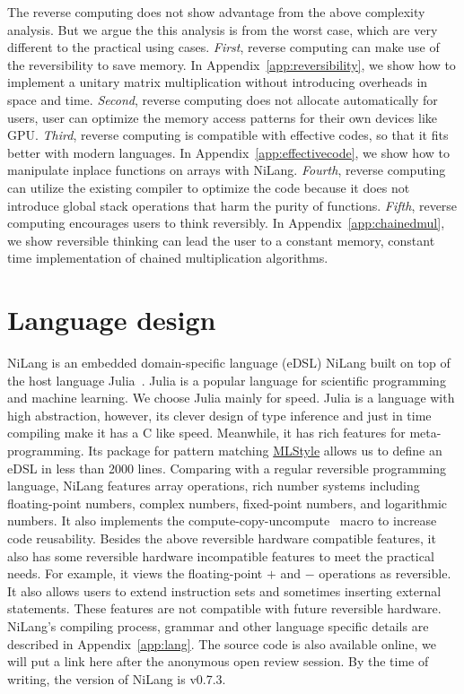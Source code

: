 \documentclass{article}
\newcommand{\<}{\langle}
\renewcommand{\>}{\rangle}
\renewcommand{\cite}[1]{{\citep{#1}}}
\newcommand{\App}[1]{Appendix~\ref{#1}}
\theoremstyle{definition}\newtheorem{definition}{\textit{Definition}}
\begin{document}
The reverse computing does not show advantage from the above complexity analysis.
But we argue the this analysis is from the worst case, which are very different to the practical using cases.
\textit{First}, reverse computing can make use of the reversibility to save memory. In \App{app:reversibility}, we show how to implement a unitary matrix multiplication without introducing overheads in space and time.
\textit{Second}, reverse computing does not allocate automatically for users, user can optimize the memory access patterns for their own devices like GPU.
\textit{Third}, reverse computing is compatible with effective codes, so that it fits better with modern languages. In \App{app:effectivecode}, we show how to manipulate inplace functions on arrays with NiLang.
\textit{Fourth}, reverse computing can utilize the existing compiler to optimize the code because it does not introduce global stack operations that harm the purity of functions.
\textit{Fifth}, reverse computing encourages users to think reversibly. In \App{app:chainedmul}, we show reversible thinking can lead the user to a constant memory, constant time implementation of chained multiplication algorithms.

\section{Language design}\label{sec:lang}

NiLang is an embedded domain-specific language (eDSL) NiLang built on top of the host language Julia~\cite{Bezanson2012,Bezanson2017}.
Julia is a popular language for scientific programming and machine learning. We choose Julia mainly for speed. Julia is a language with high abstraction, however, its clever design of type inference and just in time compiling make it has a C like speed.
Meanwhile, it has rich features for meta-programming. Its package for pattern matching \href{https://github.com/thautwarm/MLStyle.jl}{MLStyle} allows us to define an eDSL in less than 2000 lines.
Comparing with a regular reversible programming language, NiLang features array operations, rich number systems including floating-point numbers, complex numbers, fixed-point numbers, and logarithmic numbers.
It also implements the compute-copy-uncompute~\cite{Bennett1973} macro to increase code reusability.
Besides the above reversible hardware compatible features, it also has some reversible hardware incompatible features to meet the practical needs. For example, it views the floating-point $\mathrel{+}$ and $\mathrel{-}$ operations as reversible. It also allows users to extend instruction sets and sometimes inserting external statements. These features are not compatible with future reversible hardware.
NiLang's compiling process, grammar and other language specific details are described in \App{app:lang}.
The source code is also available online, we will put a link here after the anonymous open review session.
By the time of writing, the version of NiLang is v0.7.3.
\end{document}
